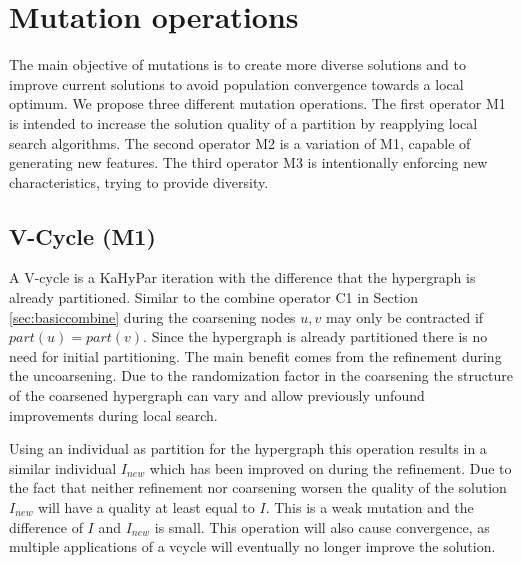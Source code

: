 \documentclass[a4paper,12pt,titlepage, BCOR7mm,headsepline]{scrbook}
\numberwithin{equation}{section}
\begin{document}
\section{Mutation operations}
\label{sec:mutations}
The main objective of mutations is to create more diverse solutions and to improve current solutions to avoid population convergence towards a local optimum.
We propose three different mutation operations. The first operator M1 is intended to increase the solution quality of a partition by reapplying local search algorithms. The second operator M2 is a variation of M1, capable of generating new features. The third operator M3 is intentionally enforcing new characteristics, trying to provide diversity.



\subsection{V-Cycle (M1)}
\label{sec:vcycles}
A V-cycle is a KaHyPar iteration with the difference that the hypergraph is already partitioned. Similar to the combine operator C1 in Section \ref{sec:basiccombine} during the coarsening nodes $u,v$ may only be contracted if $part(u) = part(v)$. Since the hypergraph is already partitioned there is no need for initial partitioning. The main benefit comes from the refinement during the uncoarsening. Due to the randomization factor in the coarsening the structure of the coarsened hypergraph can vary and allow previously unfound improvements during local search.

Using an individual as partition for the hypergraph this operation results in a similar individual $I_{new}$ which has been improved on during the refinement. Due to the fact that neither refinement nor coarsening worsen the quality of the solution $I_{new}$ will have a quality at least equal to $I$. This is a weak mutation and the difference of $I$ and $I_{new}$ is small. This operation will also cause convergence, as multiple applications of a vcycle will eventually no longer improve the solution.
\end{document}
